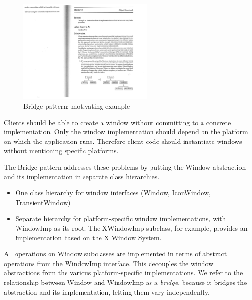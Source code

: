 \documentclass[11pt]{report}
\begin{document}
\begin{figure}
\includegraphics[width=0.6\textwidth]{bridge-1.pdf}
\caption{Bridge pattern: motivating example}
\end{figure}

Clients should be able to create a window without committing to a concrete implementation. 
Only the window implementation should depend on the platform on which the application runs. 
Therefore client code should instantiate windows without mentioning specific platforms. 

The Bridge pattern addresses these problems by putting the Window 
abstraction and its implementation in separate class hierarchies. 
\begin{itemize}
\item One class hierarchy for window interfaces 
(Window, IconWindow, TransientWindow) 
\item Separate hierarchy for platform-specific window implementations, with 
WindowImp as its root. The XWindowImp subclass, for example, provides an implementation based on the X Window 
System.
\end{itemize}

All operations on Window subclasses are implemented in terms of abstract operations from the 
WindowImp interface. This decouples the window abstractions from the various platform-specific 
implementations. We refer to the relationship between Window and WindowImp as a {\em bridge}, 
because it bridges the abstraction and its implementation, letting them vary independently.
\end{document}
